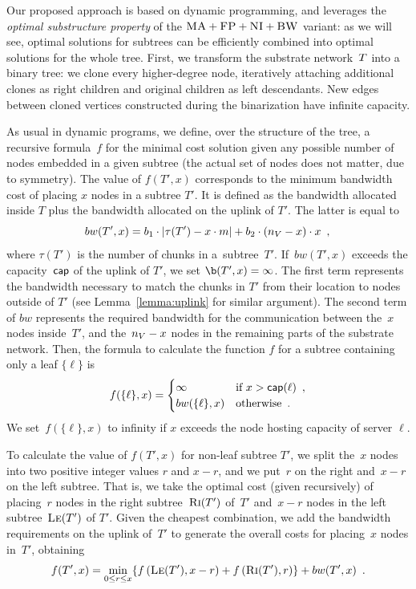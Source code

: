  Our proposed approach is based on dynamic programming, and
leverages the \emph{optimal substructure property} of the $\textsc{MA}+\textsc{FP}+\textsc{NI}+\textsc{BW}$ variant:
as we will see, optimal solutions for subtrees
can be efficiently combined into optimal solutions for the whole tree.
First, we transform the
substrate network~$T$
into a binary tree:
we clone every higher-degree node,
iteratively attaching additional clones as right children
and original children as left descendants.
New edges between cloned vertices constructed during the binarization have infinite capacity.

As usual in dynamic programs, we define, over the structure of the tree, a
recursive formula~$f$ for
the minimal cost solution given any possible number of nodes
embedded in a given subtree (the actual set of nodes does not matter,
due to symmetry).
The value of $f(T', x)$ corresponds to the minimum bandwidth cost of placing $x$ nodes in a subtree $T'$.
It is defined as the bandwidth allocated inside $T$ plus the bandwidth allocated on the uplink of $T'$.
The latter is equal to
\[
bw(T',x) = 
    b_1\cdot|\tau(T')-x\cdot m| +b_2 \cdot
(n_V - x) \cdot x\enspace, \\
  \]
  where $\tau(T')$ is the number of chunks in a~subtree~$T'$.
  If~$bw(T',x)$ exceeds the capacity~$\textsf{cap}$ of the uplink of $T'$, we set $\b(T', x) = \infty$.
  The first term represents
the bandwidth necessary to match the chunks in $T'$ from their location to
nodes outside of $T'$ (see Lemma~\ref{lemma:uplink} for similar argument).
The second term of $bw$ represents the required bandwidth for the communication between the~$x$
nodes inside~$T'$, and the~$n_V - x$ nodes in the remaining parts of the substrate
network.
Then, the formula to calculate the function $f$ for a subtree containing only a leaf $\{ \ell \}$ is
\[
f(\{ \ell \}, x) =
\begin{cases}
   \infty & \mbox{if } x > \textsf{cap}(\ell)\enspace,\\
    bw(\{ \ell \}, x) & \mbox{otherwise}\enspace. \\
  \end{cases}
  \]
We set~$f(\{ \ell \},x)$ to infinity if $x$ exceeds the node hosting capacity of server $\ell$.

To calculate the value of $f(T', x)$ for non-leaf subtree $T'$, we split the~$x$ nodes
into two positive integer
values $r$ and $x-r$, and we put~$r$ on the right and~$x - r$ on the left subtree.
That is, we take the optimal cost
(given recursively) of placing~$r$ nodes in
the right subtree~$\textsc{Ri}(T')$ of~$T'$ and~$x-r$ nodes in the left subtree~$\textsc{Le}(T')$ of
$T'$. Given the cheapest combination, we add the bandwidth requirements
on the uplink of~$T'$ to generate the overall costs for placing~$x$ nodes in~$T'$, obtaining
\[
  f(T', x) = 
    \min_{0\leq r \leq x} \{  f\left(\textsc{Le}(T'),
x-r\right) +
f\left(\textsc{Ri}(T'), r\right) \} + bw(T',x)\enspace.
  \]

